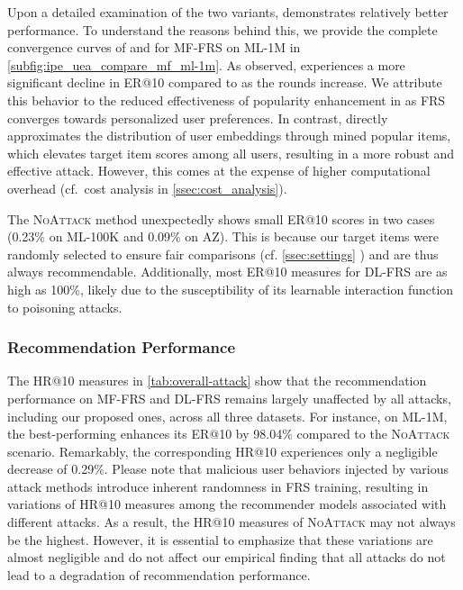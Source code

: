 Upon a detailed examination of the two \model{} variants, \modelII{} demonstrates relatively better performance. To understand the reasons behind this, we provide the complete convergence curves of \modelI{} and \modelII{} for MF-FRS on ML-1M in \cref{subfig:ipe_uea_compare_mf_ml-1m}. As observed, \modelI{} experiences a more significant decline in ER@10 compared to \modelII{} as the rounds increase. We attribute this behavior to the reduced effectiveness of popularity enhancement in \modelI{} as FRS converges towards personalized user preferences. In contrast, \modelII{} directly approximates the distribution of user embeddings through mined popular items, which elevates target item scores among all users, resulting in a more robust and effective attack.
However, this comes at the expense of higher computational overhead (cf.\ cost analysis in \cref{ssec:cost_analysis}).


The \textsc{NoAttack} method unexpectedly shows small ER@10 scores in two cases (0.23\% on ML-100K and 0.09\% on AZ). This is because our target items were randomly selected to ensure fair comparisons (cf. 
\cref{ssec:settings}
) and are thus always recommendable.
Additionally, most ER@10 measures for DL-FRS are as high as 100\%, likely due to the susceptibility of its learnable interaction function to poisoning attacks.

\subsubsection{Recommendation Performance}
The HR@10 measures in \cref{tab:overall-attack} show that the recommendation performance on MF-FRS and DL-FRS remains largely unaffected by all attacks, including our proposed ones, across all three datasets. For instance, on ML-1M, the best-performing \modelII{} enhances its ER@10 by 98.04\% compared to the \textsc{NoAttack} scenario. Remarkably, the corresponding HR@10 experiences only a negligible decrease of 0.29\%.
Please note that malicious user behaviors injected by various attack methods introduce inherent randomness in FRS training, resulting in variations of HR@10 measures among the recommender models associated with different attacks. As a result, the HR@10 measures of \textsc{NoAttack} may not always be the highest.
However, it is essential to emphasize that these variations are almost negligible and do not affect our empirical finding that all attacks do not lead to a degradation of recommendation performance.


